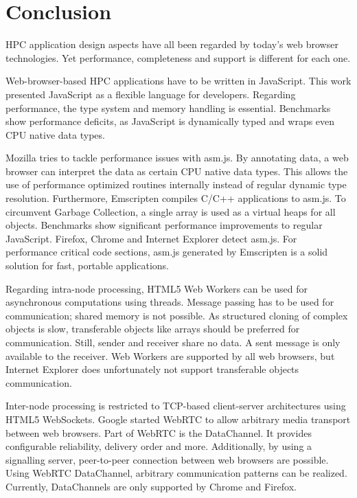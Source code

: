 \section{Conclusion} \label{chapter_conclusion}

HPC application design aspects have all been regarded by today's web browser technologies. Yet performance, completeness and support is different for each one.

Web-browser-based HPC applications have to be written in JavaScript. This work presented JavaScript as a flexible language for developers. Regarding performance, the type system and memory handling is essential. Benchmarks show performance deficits, as JavaScript is dynamically typed and wraps even CPU native data types.

Mozilla tries to tackle performance issues with asm.js. By annotating data, a web browser can interpret the data as certain CPU native data types. This allows the use of performance optimized routines internally instead of regular dynamic type resolution. Furthermore, Emscripten compiles C/C++ applications to asm.js. To circumvent Garbage Collection, a single array is used as a virtual heaps for all objects. Benchmarks show significant performance improvements to regular JavaScript. Firefox, Chrome and Internet Explorer detect asm.js. For performance critical code sections, asm.js generated by Emscripten is a solid solution for fast, portable applications.

Regarding intra-node processing, HTML5 Web Workers can be used for asynchronous computations using threads. Message passing has to be used for communication; shared memory is not possible. As structured cloning of complex objects is slow, transferable objects like arrays should be preferred for communication. Still, sender and receiver share no data. A sent message is only available to the receiver. Web Workers are supported by all web browsers, but Internet Explorer does unfortunately not support transferable objects communication.

Inter-node processing is restricted to TCP-based client-server architectures using HTML5 WebSockets. Google started WebRTC to allow arbitrary media transport between web browsers. Part of WebRTC is the DataChannel. It provides configurable reliability, delivery order and more. Additionally, by using a signalling server, peer-to-peer connection between web browsers are possible. Using WebRTC DataChannel, arbitrary communication patterns can be realized. Currently, DataChannels are only supported by Chrome and Firefox.

